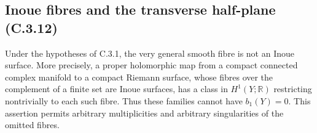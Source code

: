 \subsection{Inoue fibres and the transverse half-plane (C.3.12)}

\begin{theorem}
\label{st:C.3.12}
Under the hypotheses of C.3.1, the very general smooth fibre is
not an Inoue surface. More precisely, a proper holomorphic map from
a compact connected complex manifold to a compact Riemann surface,
whose fibres over the complement of a finite set are Inoue surfaces,
has a class in $H^1(Y;\mathbb R)$ restricting nontrivially to each
such fibre. Thus these families cannot have $b_1(Y)=0$.
This assertion permits arbitrary multiplicities and arbitrary
singularities of the omitted fibres.
\end{theorem}
